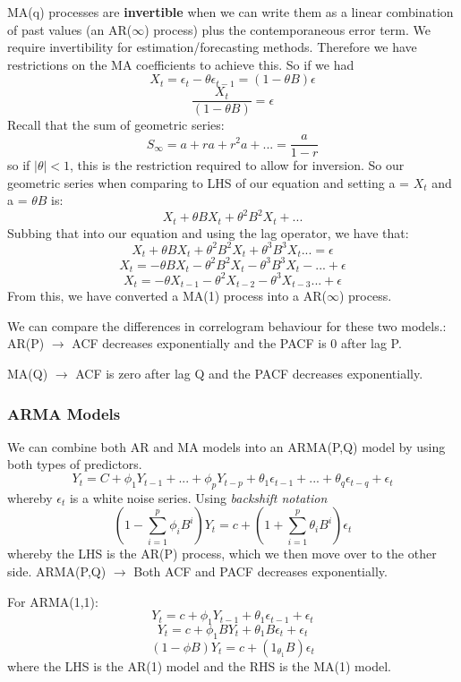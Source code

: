 \documentclass[11pt, oneside]{article}
\theoremstyle{definition}
\begin{document}
MA(q) processes are \textbf{invertible} when we can write them as a linear combination of past values (an AR($\infty$) process) plus the contemporaneous error term. We require invertibility for estimation/forecasting methods. Therefore we have restrictions on the MA coefficients to achieve this. So if we had
$$
X_t = \epsilon_t - \theta\epsilon_{t-1} = (1 - \theta B)\epsilon
$$
$$
\frac{X_t}{(1 - \theta B)} = \epsilon
$$
Recall that the sum of geometric series:
$$
S_{\infty} = a + ra + r^2a + ... = \frac{a}{1-r}
$$
so if $|\theta| < 1$, this is the restriction required to allow for inversion. So our geometric series when comparing to LHS of our equation and setting a = $X_t$ and a = $\theta B$ is:
$$
X_t + \theta BX_t + \theta^2 B^2X_t + ...
$$
Subbing that into our equation and using the lag operator, we have that:
$$
X_t + \theta BX_t + \theta^2 B^2X_t + \theta^3 B^3X_t... = \epsilon
$$
$$
X_t = -\theta BX_t - \theta^2 B^2X_t - \theta^3 B^3X_t - ... + \epsilon
$$
$$
X_t = -\theta X_{t-1} - \theta^2 X_{t-2} - \theta^3 X_{t-3} ... + \epsilon
$$
From this, we have converted a MA(1) process into a AR($\infty$) process.


We can compare the differences in correlogram behaviour for these two models.:
AR(P) $\rightarrow$ ACF decreases exponentially and the PACF is 0 after lag P.

MA(Q) $\rightarrow$ ACF is zero after lag Q and the PACF decreases exponentially.

\subsubsection{ARMA Models}
We can combine both AR and MA models into an ARMA(P,Q) model by using both types of predictors.
$$
Y_t = C + \phi_1Y_{t-1} + ... + \phi_p Y_{t-p} + \theta_1\epsilon_{t-1} + ... + \theta_q\epsilon_{t-q} + \epsilon_t
$$
whereby $\epsilon_t$ is a white noise series. Using \textit{backshift notation}
$$
(1 - \sum\limits_{i=1}^p\phi_iB^i)Y_t = c + (1 + \sum\limits_{i=1}^p\theta_iB^i)\epsilon_t
$$
whereby the LHS is the AR(P) process, which we then move over to the other side. ARMA(P,Q) $\rightarrow$ Both ACF and PACF decreases exponentially.

For ARMA(1,1):
$$
Y_t = c + \phi_1 Y_{t-1} + \theta_1\epsilon_{t-1} + \epsilon_t
$$
$$
Y_t = c + \phi_1 BY_{t} + \theta_1B\epsilon_{t} + \epsilon_t
$$
$$
(1-\phi B)Y_t = c+(1_{\theta_1} B)\epsilon_t
$$
where the LHS is the AR(1) model and the RHS is the MA(1) model.
\end{document}
